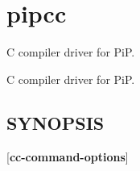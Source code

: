 \hypertarget{group__pipcc}{\section{pipcc}
\label{group__pipcc}
}


C compiler driver for Pi\-P.  


C compiler driver for Pi\-P. \hypertarget{group__pipcc_synopsis}{}\subsection{S\-Y\-N\-O\-P\-S\-I\-S}\label{group__pipcc_synopsis}
{ }\mbox{[}{\bfseries cc-\/command-\/options}\mbox{]} 